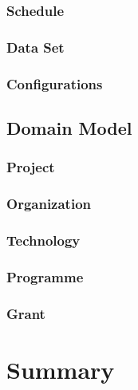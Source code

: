\subsubsection{Schedule}

\subsubsection{Data Set}

\subsubsection{Configurations}

\subsection{Domain Model}

\subsubsection{Project}

\subsubsection{Organization}

\subsubsection{Technology}

\subsubsection{Programme}

\subsubsection{Grant}

\section{Summary}
